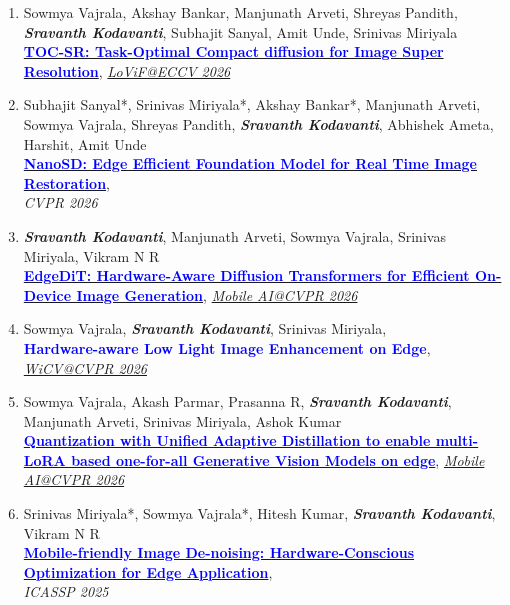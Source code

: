 \documentclass[letterpaper,11pt]{article}
\begin{document}
\begin{enumerate}

    \item Sowmya Vajrala, Akshay Bankar, Manjunath Arveti, Shreyas Pandith, \textit{\textbf{Sravanth Kodavanti}}, Subhajit Sanyal, Amit Unde, Srinivas Miriyala \\
    \href{https://arxiv.org/abs/2605.02767}{\textcolor{Blue}{\textbf{TOC-SR: Task-Optimal Compact diffusion for Image Super Resolution}}}, \href{https://lovif-eccv2026-workshop.github.io/}{\textit{LoViF@ECCV 2026}}

    \item Subhajit Sanyal*, Srinivas Miriyala*, Akshay Bankar*, Manjunath Arveti, Sowmya Vajrala, Shreyas Pandith, \textit{\textbf{Sravanth Kodavanti}}, Abhishek Ameta, Harshit, Amit Unde \\
    \href{https://arxiv.org/abs/2601.09823}{\textcolor{Blue}{\textbf{NanoSD: Edge Efficient Foundation Model for Real Time Image Restoration}}},\\
    \textit{CVPR 2026}

    \item \textit{\textbf{Sravanth Kodavanti}}, Manjunath Arveti, Sowmya Vajrala, Srinivas Miriyala, Vikram N R \\
    \href{https://arxiv.org/abs/2603.28405}{\textcolor{Blue}{\textbf{EdgeDiT: Hardware-Aware Diffusion Transformers for Efficient On-Device Image Generation}}}, \href{https://ai-benchmark.com/workshops/mai/2026/}{\textit{Mobile AI@CVPR 2026}}

    \item Sowmya Vajrala, \textit{\textbf{Sravanth Kodavanti}}, Srinivas Miriyala, \\
    \textcolor{Blue}{\textbf{Hardware-aware Low Light Image Enhancement on Edge}}, \href{https://www.wicv.org/}{\textit{WiCV@CVPR 2026}}

    \item Sowmya Vajrala, Akash Parmar, Prasanna R, \textit{\textbf{Sravanth Kodavanti}}, Manjunath Arveti, Srinivas Miriyala, Ashok Kumar \\ 
    \href{https://arxiv.org/abs/2603.29535}{\textcolor{Blue}{\textbf{Quantization with Unified Adaptive Distillation to enable multi-LoRA based one-for-all Generative Vision Models on edge}}},
    \href{https://ai-benchmark.com/workshops/mai/2026/}{\textit{Mobile AI@CVPR 2026}}

    \item Srinivas Miriyala*, Sowmya Vajrala*, Hitesh Kumar, \textit{\textbf{Sravanth Kodavanti}}, Vikram N R\\
    \href{https://arxiv.org/abs/2601.11684}
    {\textcolor{Blue}{\textbf{Mobile-friendly Image De-noising: Hardware-Conscious Optimization for Edge Application}}},\\
    \textit{ICASSP 2025}
    
\end{enumerate}
\end{document}

